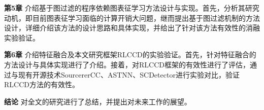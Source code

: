 \textbf{第5章}  \quad 介绍基于图过滤的程序依赖图表征学习方法设计与实现。首先，分析其研究动机，即目前图表征学习面临的计算开销大问题，继而提出基于图过滤机制的方法设计，详细介绍该方法的设计思路和具体实现，并给出了针对该方法有效性的消融实验验证。

\textbf{第6章}  \quad 介绍特征融合及本文研究框架RLCCD的实验验证。首先，针对特征融合的方法设计与具体实现进行了介绍。接着，对RLCCD框架的有效性进行了评估，通过与现有开源技术SourcererCC、ASTNN、SCDetector进行实验对比，验证RLCCD方法的有效性。

\textbf{结论}  \quad 对全文的研究进行了总结，并提出对未来工作的展望。